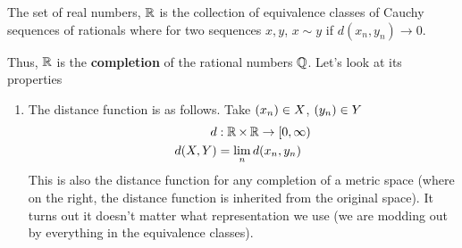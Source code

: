 \begin{definition}
    The set of real numbers, $\operatorname{\mathbb{R}}$ is the collection of equivalence classes of Cauchy sequences of rationals where for two sequences $x, y$, $x \sim y$ if $d(x_n, y_n) \to 0$.
\end{definition}
Thus, $\operatorname{\mathbb{R}}$ is the \textbf{completion} of the rational numbers $\operatorname{\mathbb{Q}}$. Let's look at its properties
\begin{enumerate}
    \item The distance function is as follows. Take $\qty(x_n) \in X$, $\qty(y_n) \in Y$
    \begin{align*}
        d&: \operatorname{\mathbb{R}} \times \operatorname{\mathbb{R}} \to [0, \infty) \\
        d(X, Y) &= \lim_n d(x_n, y_n)
    \end{align*}
    This is also the distance function for any completion of a metric space (where on the right, the distance function is inherited from the original space).
    It turns out it doesn't matter what representation we use (we are modding out by everything in the equivalence classes).
\end{enumerate}

